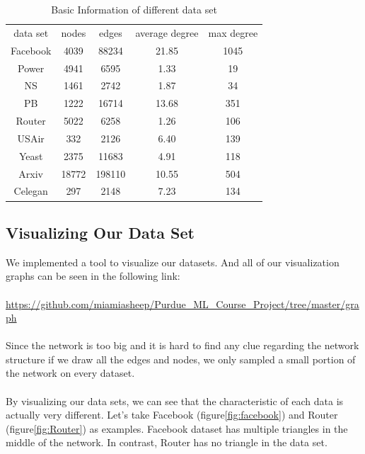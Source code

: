 \documentclass[12pt]{article}
\begin{document}
\begin{table}
	\begin{center}
		\begin{tabular}{|c|c|c|c|c|}
			\hline
			data set & nodes & edges & average degree & max degree \\
			Facebook & 4039 & 88234 & 21.85 & 1045 \\
			Power & 4941 & 6595 & 1.33 & 19 \\
			NS & 1461 & 2742 & 1.87 & 34 \\
			PB & 1222 & 16714 & 13.68 & 351 \\
			Router & 5022 & 6258 & 1.26 & 106 \\
			USAir & 332 & 2126 & 6.40 & 139 \\
			Yeast & 2375 & 11683 & 4.91 & 118 \\
			Arxiv & 18772 & 198110 & 10.55 & 504 \\
			Celegan & 297 & 2148 & 7.23 & 134 \\
			\hline 
		\end{tabular}
		\caption{Basic Information of different data set}
		\label{tab:info}
	\end{center}
\end{table}

\subsection{Visualizing Our Data Set}
We implemented a tool to visualize our datasets. And all of our visualization graphs can be seen in the following link:
\\
\\
\url{https://github.com/miamiasheep/Purdue_ML_Course_Project/tree/master/graph}
\\
\\
Since the network is too big and it is hard to find any clue regarding the network structure if we draw all the edges and nodes, we only sampled a small portion of the network on every dataset.
\\
\\
By visualizing our data sets, we can see that the characteristic of each data is actually very different. Let's take Facebook (figure\ref{fig:facebook}) and Router (figure\ref{fig:Router}) as examples. Facebook dataset has multiple triangles in the middle of the network. In contrast, Router has no triangle in the data set.
\end{document}
